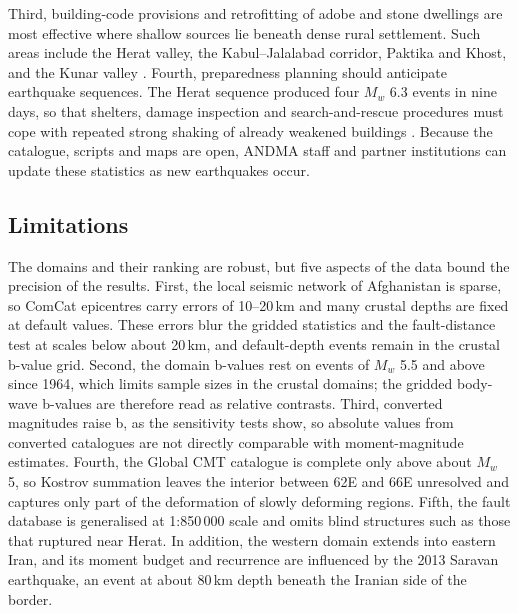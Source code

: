 \documentclass[11pt]{article}
\begin{document}
Third, building-code provisions and retrofitting of adobe and stone dwellings are
most effective where shallow sources lie beneath dense rural settlement. Such areas
include the Herat valley, the Kabul--Jalalabad corridor, Paktika and Khost, and the
Kunar valley \cite{Akhundzadah2025, Ismail2016}. Fourth, preparedness planning should
anticipate earthquake sequences. The Herat sequence produced four $M_w$ 6.3 events in
nine days, so that shelters, damage inspection and search-and-rescue procedures must
cope with repeated strong shaking of already weakened buildings \cite{WorldBank2024,
Zhao2025}. Because the catalogue, scripts and maps are open, ANDMA staff and
partner institutions can update these statistics as new earthquakes occur.

\subsection{Limitations}
The domains and their ranking are robust, but five aspects of the data bound the
precision of the results. First, the local seismic network of Afghanistan is sparse,
so ComCat epicentres carry errors of 10--20\,km and many crustal depths are fixed at
default values. These errors blur the gridded statistics and the fault-distance test
at scales below about 20\,km, and default-depth events remain in the crustal b-value
grid. Second, the domain b-values rest on events of $M_w$ 5.5 and above since 1964,
which limits sample sizes in the crustal domains; the gridded body-wave b-values are
therefore read as relative contrasts. Third, converted magnitudes raise b, as the
sensitivity tests show, so absolute values from converted catalogues are not
directly comparable with moment-magnitude estimates. Fourth, the Global CMT
catalogue is complete only above about $M_w$ 5, so Kostrov summation leaves the
interior between 62\textdegree E and 66\textdegree E unresolved and captures only
part of the deformation of slowly deforming regions. Fifth, the fault database is
generalised at 1:850\,000 scale and omits blind structures such as those that
ruptured near Herat. In addition, the western domain extends into eastern Iran, and
its moment budget and recurrence are influenced by the 2013 Saravan earthquake, an
event at about 80\,km depth beneath the Iranian side of the border.
\end{document}
